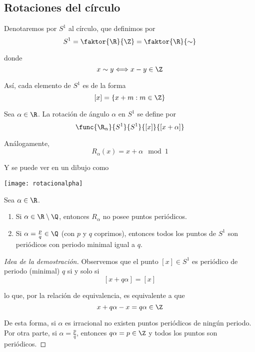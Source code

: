 \documentclass[	docname= Sistemas\ Din\'amicos,
				finished=1,
				semester=1,
				year=2017,
				professor=Godofredo\ Iommi,
				sigla=MAT2565]{apunte}
\begin{document}
\subsection{Rotaciones del círculo}
Denotaremos por $S^{1}$ al círculo, que definimos por
	$$S^{1} = \faktor{\R}{\Z} = \faktor{\R}{\sim}$$

donde
	$$x \sim y \Longleftrightarrow x - y \in \Z$$

Así, cada elemento de $S^{1}$ es de la forma
	$$[x] = \{x + m : m \in \Z\}$$

\begin{defn} Sea $\alpha \in \R$. La rotación de ángulo $\alpha$ en $S^{1}$ se define por
	$$\func{\R_{\alpha}}{S^{1}}{S^{1}}{[x]}{[x+\alpha]}$$
\end{defn}

\begin{obsd} Análogamente, 
	$$R_{\alpha}(x) = x + \alpha \mod 1$$

Y se puede ver en un dibujo como
	\begin{center}
		\texttt{[image: rotacionalpha]}
	\end{center}
\end{obsd}

\begin{lem} Sea $\alpha \in \R$.
	\begin{enumerate}[\indent 1)]
		\item Si $\alpha \in \R \setminus \Q$, entonces $R_{\alpha}$ no posee puntos periódicos.
		\item Si $\alpha = \frac{p}{q} \in \Q$ (con $p$ y $q$ coprimos), entonces todos los puntos de $S^{1}$ son periódicos con periodo minimal igual a $q$.
	\end{enumerate}
\end{lem}

\begin{proof}[Idea de la demostración] Observemos que el punto $[x] \in S^{1}$ es periódico de periodo (minimal) $q$ si y solo si
	$$[x + q\alpha] = [x] $$

lo que, por la relación de equivalencia, es equivalente a que 
	$$x + q\alpha - x = q\alpha \in \Z$$

De esta forma, si $\alpha$ es irracional no existen puntos periódicos de ningún periodo. Por otra parte, si $\alpha = \frac{p}{q}$, entonces $q\alpha = p \in \Z$ y todos los puntos son periódicos.
\end{proof}

\end{document}
